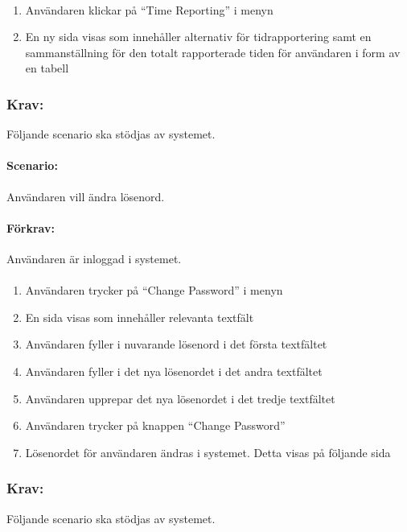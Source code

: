 \documentclass[paper=a4, fontsize=11pt,twoside]{article}
\begin{document}
	\paragraph{}
	\begin{enumerate}
		\item  Användaren klickar på “Time Reporting” i menyn
		\item  En ny sida visas som innehåller alternativ för tidrapportering samt en sammanställning för den totalt rapporterade tiden för användaren i form av en tabell
		
	\end{enumerate}
	\newpage
	\subsubsection{Krav:} Följande scenario ska stödjas av systemet.
	\paragraph{Scenario:}Användaren vill ändra lösenord.
	\paragraph{Förkrav:}
	Användaren är inloggad i systemet.
	\paragraph{}
	\begin{enumerate}
		\item	Användaren trycker på “Change Password” i menyn
		\item	En sida visas som innehåller relevanta textfält
		\item	Användaren fyller i nuvarande lösenord i det första textfältet
		\item	Användaren fyller i det nya lösenordet i det andra textfältet
		\item	Användaren upprepar det nya lösenordet i det tredje textfältet
		\item	Användaren trycker på knappen “Change Password”
		\item	Lösenordet för användaren ändras i systemet. Detta visas på följande sida
		
	\end{enumerate}
	
	\subsubsection{Krav:}Följande scenario ska stödjas av systemet.
\end{document}
